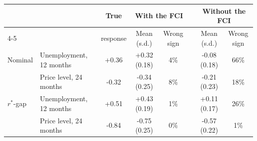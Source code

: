 \begin{tabular}{llcccccc}\toprule
& & True & \multicolumn{2}{c}{With the FCI} & & \multicolumn{2}{c}{Without the FCI} \\
\cmidrule{4-5}\cmidrule{7-8}
& & response & Mean (s.d.) & Wrong sign & & Mean (s.d.) & Wrong sign \\\midrule
Nominal & Unemployment, 12 months & +0.36 & +0.32 (0.18) & 4\% & & -0.08 (0.18) & 66\% \\
 & Price level, 24 months & -0.32 & -0.34 (0.25) & 8\% & & -0.21 (0.23) & 18\% \\
$r^*$-gap & Unemployment, 12 months & +0.51 & +0.43 (0.19) & 1\% & & +0.11 (0.17) & 26\% \\
 & Price level, 24 months & -0.84 & -0.75 (0.25) & 0\% & & -0.57 (0.22) & 1\% \\
\bottomrule\end{tabular}
